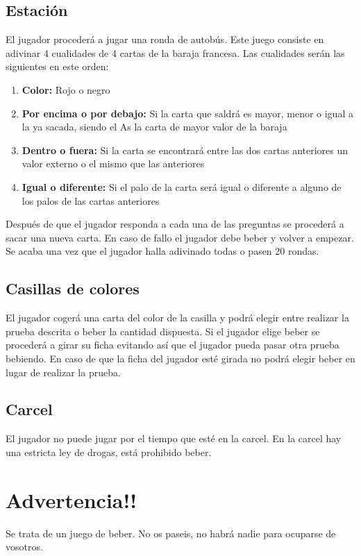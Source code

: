 \documentclass[10pt,a5paper]{article}
\begin{document}
\subsection{Estación}
El jugador procederá a jugar una ronda de autobús. Este juego consiste en adivinar 4 cualidades de 4 cartas de la baraja francesa. Las cualidades serán las siguientes en este orden:
\begin{enumerate}
	\item \textbf{Color:} Rojo o negro
	\item \textbf{Por encima o por debajo:} Si la carta que saldrá es mayor, menor o igual a la ya sacada, siendo el As la carta de mayor valor de la baraja
	\item \textbf{Dentro o fuera:} Si la carta se encontrará entre las dos cartas anteriores un valor externo o el mismo que las anteriores
	\item \textbf{Igual o diferente:} Si el palo de la carta será igual o diferente a alguno de los palos de las cartas anteriores
\end{enumerate}
Después de que el jugador responda a cada una de las preguntas se procederá a sacar una nueva carta. En caso de fallo el jugador debe beber y volver a empezar. Se acaba una vez que el jugador halla adivinado todas o pasen 20 rondas.

\subsection{Casillas de colores}
El jugador cogerá una carta del color de la casilla y podrá elegir entre realizar la prueba descrita o beber la cantidad dispuesta. Si el jugador elige beber se procederá a girar su ficha evitando así que el jugador pueda pasar otra prueba bebiendo. En caso de que la ficha del jugador esté girada no podrá elegir beber en lugar de realizar la prueba.
\subsection{Carcel}
El jugador no puede jugar por el tiempo que esté en la carcel. En la carcel hay una estricta ley de drogas, está prohibido beber.

\section{Advertencia!!}
Se trata de un juego de beber. No os paseis, no habrá nadie para ocuparse de vosotros.
\end{document}
